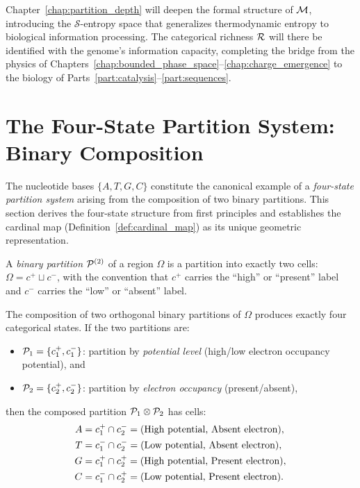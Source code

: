 Chapter~\ref{chap:partition_depth} will deepen the formal structure of $\mathcal{M}$,
introducing the $\mathcal{S}$-entropy space that generalizes thermodynamic
entropy to biological information processing. The categorical richness $\mathcal{R}$
will there be identified with the genome's information capacity, completing
the bridge from the physics of Chapters~\ref{chap:bounded_phase_space}--\ref{chap:charge_emergence}
to the biology of Parts~\ref{part:catalysis}--\ref{part:sequences}.

\section{The Four-State Partition System: Binary Composition}
\label{sec:four_state}

The nucleotide bases $\{A, T, G, C\}$ constitute the canonical example of a
\emph{four-state partition system} arising from the composition of two binary
partitions. This section derives the four-state structure from first principles
and establishes the cardinal map (Definition~\ref{def:cardinal_map}) as its
unique geometric representation.

\begin{definition}
\label{def:binary_partition}
A \emph{binary partition} $\mathcal{P}^{(2)}$ of a region $\Omega$ is a partition
into exactly two cells: $\Omega = c^+ \sqcup c^-$, with the convention that
$c^+$ carries the ``high'' or ``present'' label and $c^-$ carries the
``low'' or ``absent'' label.
\end{definition}

\begin{theorem}
\label{thm:four_state}
The composition of two orthogonal binary partitions of $\Omega$ produces
exactly four categorical states. If the two partitions are:
\begin{itemize}
  \item $\mathcal{P}_1 = \{c^+_1, c^-_1\}$: partition by \emph{potential level}
        (high/low electron occupancy potential), and
  \item $\mathcal{P}_2 = \{c^+_2, c^-_2\}$: partition by \emph{electron occupancy}
        (present/absent),
\end{itemize}
then the composed partition $\mathcal{P}_1 \otimes \mathcal{P}_2$ has cells:
\begin{align}
  A &= c^+_1 \cap c^-_2 = \text{(High potential, Absent electron)}, \notag \\
  T &= c^-_1 \cap c^-_2 = \text{(Low potential, Absent electron)}, \notag \\
  G &= c^+_1 \cap c^+_2 = \text{(High potential, Present electron)}, \notag \\
  C &= c^-_1 \cap c^+_2 = \text{(Low potential, Present electron)}. \notag
\end{align}
\end{theorem}

